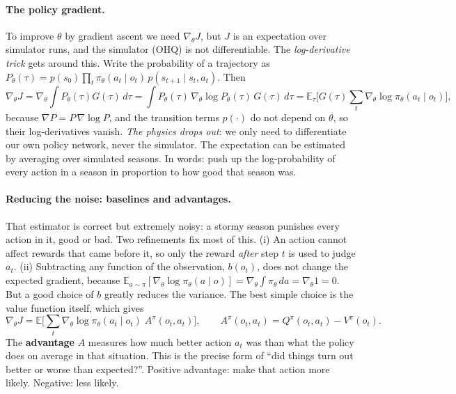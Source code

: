 \paragraph{The policy gradient.} To improve $\theta$ by gradient ascent we
need $\nabla_\theta J$, but $J$ is an expectation over simulator runs, and
the simulator (OHQ) is not differentiable. The \emph{log-derivative trick}
gets around this. Write the probability of a trajectory as
$P_\theta(\tau)=p(s_0)\prod_t\pi_\theta(a_t\mid o_t)\,p(s_{t+1}\mid s_t,a_t)$.
Then
\[
\nabla_\theta J=\nabla_\theta\!\int\!P_\theta(\tau)G(\tau)\,d\tau
=\int\!P_\theta(\tau)\,\nabla_\theta\log P_\theta(\tau)\,G(\tau)\,d\tau
=\mathbb E_{\tau}\Big[G(\tau)\sum_t\nabla_\theta\log\pi_\theta(a_t\mid o_t)\Big],
\]
because $\nabla P=P\,\nabla\log P$, and the transition terms $p(\cdot)$ do
not depend on $\theta$, so their log-derivatives vanish. \emph{The physics
drops out}: we only need to differentiate our own policy network, never the
simulator. The expectation can be estimated by averaging over simulated
seasons. In words: push up the log-probability of every action in a season
in proportion to how good that season was.

\paragraph{Reducing the noise: baselines and advantages.} That estimator is
correct but extremely noisy: a stormy season punishes every action in it,
good or bad. Two refinements fix most of this. (i) An action cannot affect
rewards that came before it, so only the reward \emph{after} step $t$ is
used to judge $a_t$. (ii) Subtracting any function of the observation,
$b(o_t)$, does not change the expected gradient, because
$\mathbb E_{a\sim\pi}[\nabla_\theta\log\pi_\theta(a\mid o)]=\nabla_\theta\!\int\!\pi_\theta\,da=\nabla_\theta 1=0$.
But a good choice of $b$ greatly reduces the variance. The best simple
choice is the value function itself, which gives
\begin{equation}
\nabla_\theta J=\mathbb E\Big[\sum_t \nabla_\theta\log\pi_\theta(a_t\mid o_t)\;A^\pi(o_t,a_t)\Big],
\qquad A^\pi(o_t,a_t)=Q^\pi(o_t,a_t)-V^\pi(o_t).
\label{eq:pg}
\end{equation}
The \textbf{advantage} $A$ measures how much better action $a_t$ was than
what the policy does on average in that situation. This is the precise
form of ``did things turn out better or worse than expected?''. Positive
advantage: make that action more likely. Negative: less likely.

